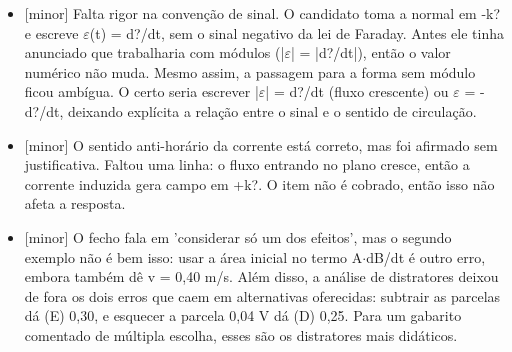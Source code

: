 \documentclass{article}%
\begin{document}
\begin{itemize}%
\item%
{[}minor{]} Falta rigor na convenção de sinal. O candidato toma a normal em -k? e escreve $\varepsilon$(t) = d?/dt, sem o sinal negativo da lei de Faraday. Antes ele tinha anunciado que trabalharia com módulos (|$\varepsilon$| = |d?/dt|), então o valor numérico não muda. Mesmo assim, a passagem para a forma sem módulo ficou ambígua. O certo seria escrever |$\varepsilon$| = d?/dt (fluxo crescente) ou $\varepsilon$ = -d?/dt, deixando explícita a relação entre o sinal e o sentido de circulação.%
\item%
{[}minor{]} O sentido anti{-}horário da corrente está correto, mas foi afirmado sem justificativa. Faltou uma linha: o fluxo entrando no plano cresce, então a corrente induzida gera campo em +k?. O item não é cobrado, então isso não afeta a resposta.%
\item%
{[}minor{]} O fecho fala em 'considerar só um dos efeitos', mas o segundo exemplo não é bem isso: usar a área inicial no termo A$\cdot$dB/dt é outro erro, embora também dê v = 0,40 m/s. Além disso, a análise de distratores deixou de fora os dois erros que caem em alternativas oferecidas: subtrair as parcelas dá (E) 0,30, e esquecer a parcela 0,04 V dá (D) 0,25. Para um gabarito comentado de múltipla escolha, esses são os distratores mais didáticos.%
\end{itemize}%
\end{document}
